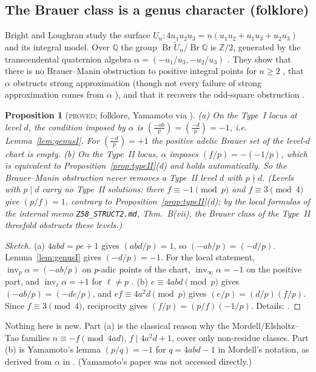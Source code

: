 \documentclass[10pt,reqno]{amsart}
\newtheorem{proposition}[theorem]{Proposition}
\theoremstyle{definition}
\numberwithin{equation}{section}
\newcommand{\Z}{\mathbb Z}
\newcommand{\Q}{\mathbb Q}
\DeclareMathOperator{\Br}{Br}
\newcommand{\status}[1]{\textup{\textsc{#1}}}
\newcommand{\leg}[2]{\left(\frac{#1}{#2}\right)}
\begin{document}
\subsection{The Brauer class is a genus character (folklore)}
Bright and Loughran \cite{BL} study the surface
$U_n:4u_1u_2u_3=n(u_1u_2+u_1u_3+u_2u_3)$ and its integral model. Over $\Q$
the group $\Br\tilde U_n/\Br\Q$ is $\Z/2$, generated by the transcendental
quaternion algebra $\alpha=(-u_1/u_3,-u_2/u_3)$ \cite[Cor.~2.7]{BL}. They
show that there is no Brauer--Manin obstruction to positive integral points
for $n\ge2$ \cite[Thms.~1.1, 1.8]{BL}, that $\alpha$ obstructs strong
approximation \cite[Thm.~1.8 (1.5), Thms.~1.2, 1.5]{BL} (though not every
failure of strong approximation comes from $\alpha$ \cite[Thm.~1.9]{BL}), and that it recovers the
odd-square obstruction \cite[Thm.~1.2, Cor.~1.4]{BL}.

\begin{proposition}[\status{proved}; folklore, Yamamoto \cite{Ya} via {\cite[App.~A]{BL}}]\label{prop:brauer}
\textup{(a)} On the Type~I locus at level $d$, the condition imposed by
$\alpha$ is $\leg{-ab}{p}=\leg{-d}{p}=-1$, i.e. Lemma~\ref{lem:genusI}.
For $\leg{-d}{p}=+1$ the positive adelic Brauer set of the level-$d$
chart is empty.
\textup{(b)} On the Type~II locus, $\alpha$ imposes
$(f/p)=-(-1/p)$, which is equivalent to Proposition~\ref{prop:typeII}(d)
and holds automatically. So the Brauer--Manin obstruction never removes a
Type~II level $d$ with $p\nmid d$. (Levels with $p\mid d$ carry no Type~II
solutions: there $f\equiv-1\pmod p$ and $f\equiv3\pmod4$ give $(p/f)=1$,
contrary to Proposition~\ref{prop:typeII}(d); by the local formulas of the
internal memo \texttt{Z58\_STRUCT2.md}, Thm.~B(vii), the Brauer class of
the Type~II threefold obstructs these levels.)
\end{proposition}
\begin{proof}[Sketch]
(a) $4abd=pe+1$ gives $(abd/p)=1$, so $(-ab/p)=(-d/p)$. Lemma~\ref{lem:genusI}
gives $(-d/p)=-1$. For the local statement, $\operatorname{inv}_p\alpha=(-ab/p)$
on $p$-adic points of the chart, $\operatorname{inv}_\infty\alpha=-1$ on the
positive part, and $\operatorname{inv}_\ell\alpha=+1$ for $\ell\ne p$
\cite[Lemmas~3.1, 3.5, 3.8]{BL}.
(b) $e\equiv4abd\pmod p$ gives $(-ab/p)=(-de/p)$, and $ef\equiv4a^2d\pmod p$
gives $(e/p)=(d/p)(f/p)$. Since $f\equiv3\pmod4$, reciprocity gives
$(f/p)=(p/f)(-1/p)$. Details: \cite[Props.~5.1, 5.2]{O126}.
\end{proof}
Nothing here is new. Part (a) is the classical reason why the
Mordell/Elsholtz--Tao families $n\equiv-f\pmod{4ad}$, $f\mid4a^2d+1$, cover
only non-residue classes. Part (b) is Yamamoto's lemma $(p/q)=-1$ for
$q=4abd-1$ in Mordell's notation, as derived from $\alpha$ in
\cite[App.~A]{BL}. (Yamamoto's paper was not accessed directly.)
\end{document}
